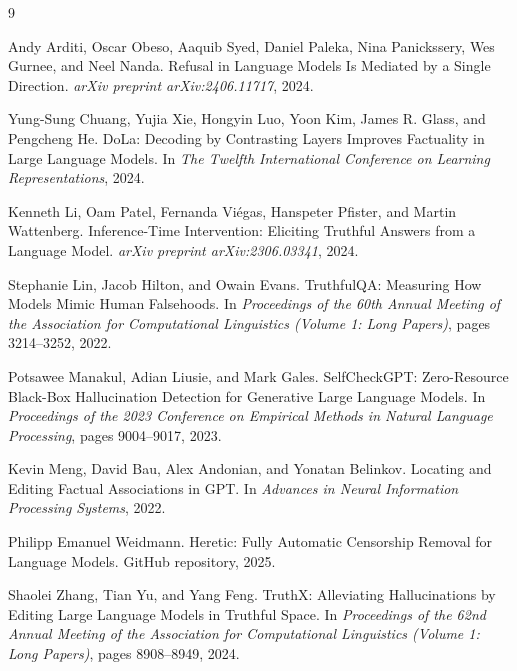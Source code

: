 \documentclass{article}
\begin{document}
\begin{thebibliography}{9}

Andy Arditi, Oscar Obeso, Aaquib Syed, Daniel Paleka, Nina Panickssery, Wes Gurnee, and Neel Nanda.
\newblock Refusal in Language Models Is Mediated by a Single Direction.
\newblock \emph{arXiv preprint arXiv:2406.11717}, 2024.

Yung-Sung Chuang, Yujia Xie, Hongyin Luo, Yoon Kim, James R. Glass, and Pengcheng He.
\newblock DoLa: Decoding by Contrasting Layers Improves Factuality in Large Language Models.
\newblock In \emph{The Twelfth International Conference on Learning Representations}, 2024.

Kenneth Li, Oam Patel, Fernanda Vi{\'e}gas, Hanspeter Pfister, and Martin Wattenberg.
\newblock Inference-Time Intervention: Eliciting Truthful Answers from a Language Model.
\newblock \emph{arXiv preprint arXiv:2306.03341}, 2024.

Stephanie Lin, Jacob Hilton, and Owain Evans.
\newblock TruthfulQA: Measuring How Models Mimic Human Falsehoods.
\newblock In \emph{Proceedings of the 60th Annual Meeting of the Association for Computational Linguistics (Volume 1: Long Papers)}, pages 3214--3252, 2022.

Potsawee Manakul, Adian Liusie, and Mark Gales.
\newblock SelfCheckGPT: Zero-Resource Black-Box Hallucination Detection for Generative Large Language Models.
\newblock In \emph{Proceedings of the 2023 Conference on Empirical Methods in Natural Language Processing}, pages 9004--9017, 2023.

Kevin Meng, David Bau, Alex Andonian, and Yonatan Belinkov.
\newblock Locating and Editing Factual Associations in GPT.
\newblock In \emph{Advances in Neural Information Processing Systems}, 2022.

Philipp Emanuel Weidmann.
\newblock Heretic: Fully Automatic Censorship Removal for Language Models.
\newblock GitHub repository, 2025.

Shaolei Zhang, Tian Yu, and Yang Feng.
\newblock TruthX: Alleviating Hallucinations by Editing Large Language Models in Truthful Space.
\newblock In \emph{Proceedings of the 62nd Annual Meeting of the Association for Computational Linguistics (Volume 1: Long Papers)}, pages 8908--8949, 2024.

\end{thebibliography}
\end{document}
